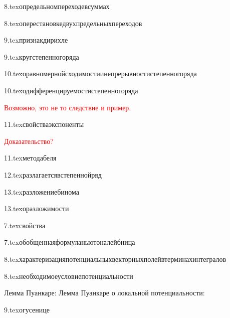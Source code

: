 {8.tex}{определьномпереходевсуммах}

{8.tex}{оперестановкедвухпредельныхпереходов}

{9.tex}{признакдирихле}

{9.tex}{кругстепенногоряда}

{10.tex}{оравномернойсходимостиинепрерывностистепенногоряда}

{10.tex}{одифференцируемостистепенногоряда}

\textcolor{red}{Возможно, это не то следствие и пример.}

{11.tex}{свойстваэкспоненты}

\textcolor{red}{Доказательство?}

{11.tex}{методабеля}

{12.tex}{разлагаетсявстепеннойряд}

{13.tex}{разложениебинома}

{13.tex}{оразложимости}

{7.tex}{свойства}

{7.tex}{обобщеннаяформуланьютоналейбница}

{8.tex}{характеризацияпотенциальныхвекторныхполейвтерминахинтегралов}

{8.tex}{необходимоеусловиепотенциальности}

Лемма Пуанкаре:
Лемма Пуанкаре о локальной потенциальности:

{9.tex}{огусенице}

